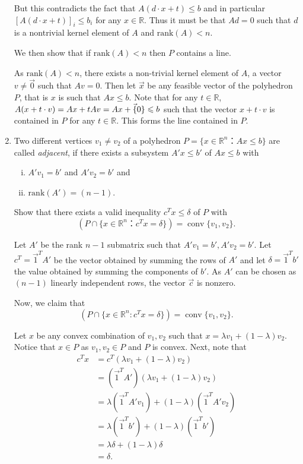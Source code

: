 \documentclass[11pt]{article}
\DeclareMathOperator{\conv}{conv}
\newcommand{\setR}{\mathbb{R}}
\renewcommand{\leq}{\leqslant}
\newcommand{\rank}{\mathrm{rank}}
\begin{document}
\begin{enumerate}[1)]
\begin{solution}
  But this contradicts the fact that $A(d\cdot x +t) \leq b$ and in particular $[A(d\cdot x +t)]_i \leq b_i$ for any $x \in \setR$. Thus it must be that $Ad= 0$ such that $d$ is a nontrivial kernel element of $A$ and $\rank(A) < n$. 
  
  
  
  
  
  We then show that if $\rank(A) < n$ then $P$ contains a line. 
  
  As $\rank(A) <n$, there exists a non-trivial kernel element of $A$, a vector $v \neq \vec{0}$ such that $Av = 0$. Then let $\vec{x}$ be any feasible vector of the polyhedron $P$, that is $x$ is such that $Ax \leq b$. Note that for any $t \in \setR$, $A(x+ t\cdot v) = Ax + tAv = Ax + \vec\{0\} \leq b$ such that the vector $x + t \cdot v$ is contained in $P$ for any $t \in \setR$. This forms the line contained in $P$.  
  \end{solution}

\item \label{item:11} Two different vertices $v_1 ≠ v_2$ of a polyhedron $P = \{ x ∈ ℝ^n ： Ax≤b\}$ are called \emph{adjacent}, if there exists a subsystem $A'x ≤ b'$ of $Ax≤b$ with
\begin{enumerate}[i)] 
\item $A'v_1 = b'$ and $A'v_2 = b'$  and
\item $\rank(A') = (n-1)$. 
\end{enumerate}

Show that there exists a valid inequality $c^Tx ≤ δ$ of $P$ with
\begin{displaymath}
 \left( P ∩ \{ x ∈ ℝ^n ： c^Tx = δ \} \right) = \conv\{v_1,v_2\}. 
\end{displaymath}



\begin{solution}
Let $A'$ be the rank $n-1$ submatrix such that $A'v_1 = b', A'v_2 = b'$. Let $c^T = \vec{1}^TA'$ be the vector obtained by summing the rows of $A'$ and let $\delta = \vec{1}^Tb'$ the value obtained by summing the components of $b'$. As $A'$ can be chosen as $(n-1)$ linearly independent rows, the vector $\vec{c}$ is nonzero. 

Now, we claim that $$(P \cap \{x \in \setR^n: c^Tx = \delta\}) = \conv\{v_1, v_2\}.$$

Let $x$ be any convex combination of $v_1, v_2$ such that $x = \lambda v_1 + (1 - \lambda)v_2$. Notice that $x \in P$ as $v_1, v_2 \in P$ and $P$ is convex. Next, note that
\begin{align*}
c^Tx & = c^T ( \lambda v_1 + (1 - \lambda)v_2) \\
& = (\vec{1}^TA') (\lambda v_1 + (1 - \lambda)v_2) \\
& = \lambda (\vec{1}^T A' v_1) + (1-\lambda)(\vec{1}^TA' v_2) \\
& = \lambda (\vec{1}^T b') + (1-\lambda)(\vec{1}^T b') \\
& = \lambda \delta + (1-\lambda)\delta \\
& = \delta. 
\end{align*}


\end{solution}
\end{enumerate}
\end{document}
